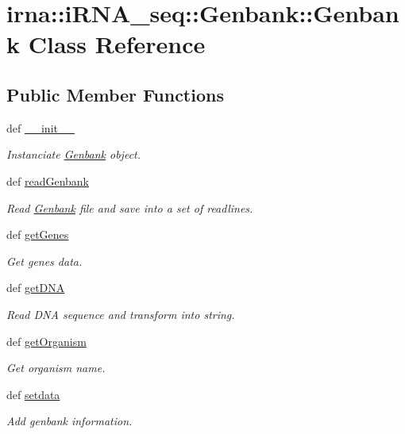 \hypertarget{classirna_1_1iRNA__seq_1_1Genbank_1_1Genbank}{
\section{irna\-:\-:i\-R\-N\-A\-\_\-seq\-:\-:\-Genbank\-:\-:\-Genbank \-Class \-Reference}
\label{classirna_1_1iRNA__seq_1_1Genbank_1_1Genbank}
}
\subsection*{\-Public \-Member \-Functions}
\begin{DoxyCompactItemize}
\item 
def \hyperlink{classirna_1_1iRNA__seq_1_1Genbank_1_1Genbank_a580b941b93ac247e97cdb276c7336373}{\-\_\-\-\_\-init\-\_\-\-\_\-}
\begin{DoxyCompactList}\small\item\em \-Instanciate \hyperlink{classirna_1_1iRNA__seq_1_1Genbank_1_1Genbank}{\-Genbank} object. \end{DoxyCompactList}\item 
def \hyperlink{classirna_1_1iRNA__seq_1_1Genbank_1_1Genbank_a6205ea0953791e0cfcfaca69ecf96986}{read\-Genbank}
\begin{DoxyCompactList}\small\item\em \-Read \hyperlink{classirna_1_1iRNA__seq_1_1Genbank_1_1Genbank}{\-Genbank} file and save into a set of readlines. \end{DoxyCompactList}\item 
def \hyperlink{classirna_1_1iRNA__seq_1_1Genbank_1_1Genbank_a6c427b3f3e011378f67a381e7af9d31b}{get\-Genes}
\begin{DoxyCompactList}\small\item\em \-Get genes data. \end{DoxyCompactList}\item 
def \hyperlink{classirna_1_1iRNA__seq_1_1Genbank_1_1Genbank_a74d7461e68a76ee947b14ed86ca3f9b7}{get\-D\-N\-A}
\begin{DoxyCompactList}\small\item\em \-Read \-D\-N\-A sequence and transform into string. \end{DoxyCompactList}\item 
def \hyperlink{classirna_1_1iRNA__seq_1_1Genbank_1_1Genbank_a300268fa00476a7a609f869467287c11}{get\-Organism}
\begin{DoxyCompactList}\small\item\em \-Get organism name. \end{DoxyCompactList}\item 
def \hyperlink{classirna_1_1iRNA__seq_1_1Genbank_1_1Genbank_a50f4a5b39d667d9a40296a9cbf657950}{setdata}
\begin{DoxyCompactList}\small\item\em \-Add genbank information. \end{DoxyCompactList}\end{DoxyCompactItemize}
